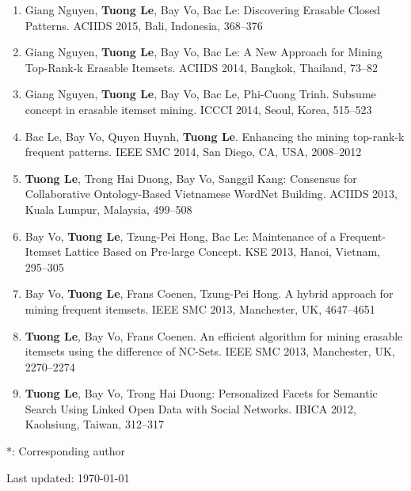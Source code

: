 \documentclass[letterpaper]{article}
\begin{document}
\begin{enumerate}

\item Giang Nguyen, \textbf{Tuong Le}, Bay Vo, Bac Le: Discovering Erasable Closed Patterns. ACIIDS 2015, Bali, Indonesia, 368--376

\item Giang Nguyen, \textbf{Tuong Le}, Bay Vo, Bac Le: A New Approach for Mining Top-Rank-k Erasable Itemsets. ACIIDS 2014, Bangkok, Thailand, 73--82

\item Giang Nguyen, \textbf{Tuong Le}, Bay Vo, Bac Le, Phi-Cuong Trinh. Subsume concept in erasable itemset mining. ICCCI 2014, Seoul, Korea, 515--523

\item Bac Le, Bay Vo, Quyen Huynh, \textbf{Tuong Le}. Enhancing the mining top-rank-k frequent patterns. IEEE SMC 2014, San Diego, CA, USA, 2008--2012

\item \textbf{Tuong Le}, Trong Hai Duong, Bay Vo, Sanggil Kang: Consensus for Collaborative Ontology-Based Vietnamese WordNet Building. ACIIDS 2013, Kuala Lumpur, Malaysia, 499--508

\item Bay Vo, \textbf{Tuong Le}, Tzung-Pei Hong, Bac Le: Maintenance of a Frequent-Itemset Lattice Based on Pre-large Concept. KSE 2013, Hanoi, Vietnam, 295--305

\item Bay Vo, \textbf{Tuong Le}, Frans Coenen, Tzung-Pei Hong. A hybrid approach for mining frequent itemsets. IEEE SMC 2013, Manchester, UK, 4647--4651

\item \textbf{Tuong Le}, Bay Vo, Frans Coenen. An efficient algorithm for mining erasable itemsets using the difference of NC-Sets. IEEE SMC 2013, Manchester, UK, 2270--2274

\item \textbf{Tuong Le}, Bay Vo, Trong Hai Duong:
Personalized Facets for Semantic Search Using Linked Open Data with Social Networks. IBICA 2012, Kaohsiung, Taiwan, 312--317

\end{enumerate}

*: Corresponding author

\bigskip

\begin{center}
  \begin{footnotesize}
    Last updated: \today 
  \end{footnotesize}
\end{center}
\end{document}

